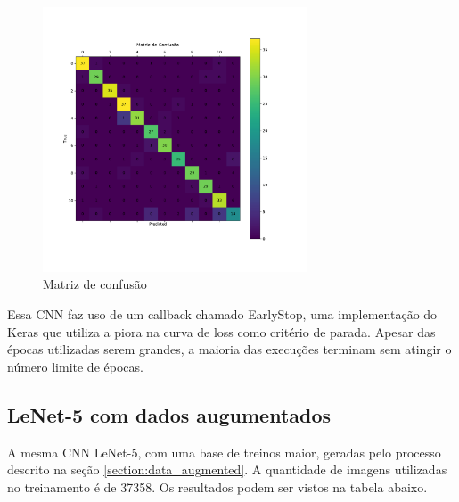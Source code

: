\documentclass[12pt,
	english,			%
	french,				%
	spanish,			%
	brazil,				%
	]{article}
\begin{document}
\begin{figure}[!htb]
\centering
\includegraphics[width=0.7\textwidth]{images/cm_simple_cnn.pdf}
\caption{\label{fig:grafico01}Matriz de confusão}
\end{figure}

Essa CNN faz uso de um callback chamado EarlyStop, uma implementação do Keras que utiliza a piora na curva de loss como critério de parada. Apesar das épocas utilizadas serem grandes, a maioria das execuções terminam sem atingir o número limite de épocas.


\subsection{LeNet-5 com dados augumentados}

A mesma CNN LeNet-5, com uma base de treinos maior, geradas pelo processo descrito na seção \ref{section:data_augmented}. A quantidade de imagens utilizadas no treinamento é de 37358. Os resultados podem ser vistos na tabela abaixo.
\end{document}
